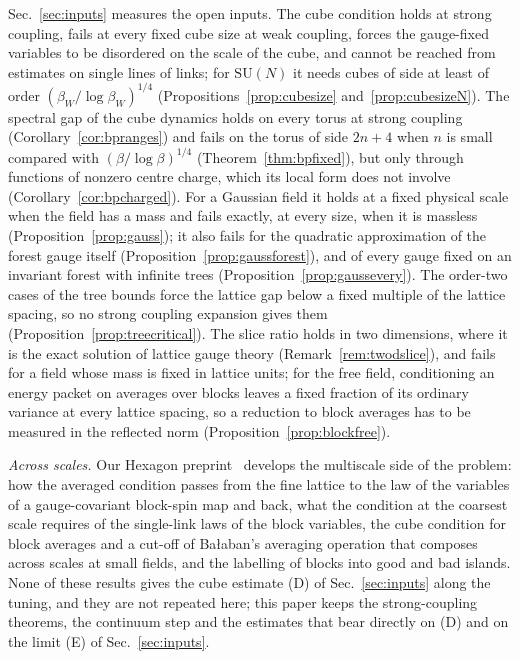 \documentclass[aps,prd,twocolumn,superscriptaddress,nofootinbib,longbibliography,floatfix,amsmath,amssymb,10pt]{revtex4-2}
\theoremstyle{definition}
\theoremstyle{remark}
\newcommand{\SU}{\mathrm{SU}}
\begin{document}
Sec.~\ref{sec:inputs} measures the open inputs. The cube condition holds
at strong coupling, fails at every fixed cube size at weak coupling, forces
the gauge-fixed variables to be disordered on the scale of the cube, and
cannot be reached from estimates on single lines of links; for $\SU(N)$ it
needs cubes of side at least of order $(\beta_W/\log\beta_W)^{1/4}$
(Propositions~\ref{prop:cubesize} and~\ref{prop:cubesizeN}). The
spectral gap of the cube dynamics holds on every torus at strong coupling
(Corollary~\ref{cor:bpranges}) and fails on the torus of side $2n+4$ when
$n$ is small compared with $(\beta/\log\beta)^{1/4}$
(Theorem~\ref{thm:bpfixed}), but only through functions of nonzero centre
charge, which its local form does not involve
(Corollary~\ref{cor:bpcharged}). For a Gaussian
field it holds at a fixed physical scale when the field has a mass and fails
exactly, at every size, when it is massless (Proposition~\ref{prop:gauss});
it also fails for the quadratic approximation of the forest gauge itself
(Proposition~\ref{prop:gaussforest}), and of every gauge fixed on an
invariant forest with infinite trees (Proposition~\ref{prop:gaussevery}). The order-two cases of the tree bounds
force the lattice gap below a fixed multiple of the lattice spacing, so no
strong coupling expansion gives them (Proposition~\ref{prop:treecritical}).
The slice ratio holds in two dimensions, where it is the exact solution of
lattice gauge theory (Remark~\ref{rem:twodslice}), and fails for a field
whose mass is fixed in lattice units; for the free field, conditioning an
energy packet on averages over blocks leaves a fixed fraction of its ordinary
variance at every lattice spacing, so a reduction to block averages has to be
measured in the reflected norm (Proposition~\ref{prop:blockfree}).

\emph{Across scales.} Our Hexagon preprint~\cite{BBLR26} develops the
multiscale side of the problem: how the averaged condition passes from the
fine lattice to the law of the variables of a gauge-covariant block-spin map
and back, what the condition at the coarsest scale requires of the
single-link laws of the block variables, the cube condition for block
averages and a cut-off of Ba{\l}aban's averaging operation that composes
across scales at small fields, and the labelling of blocks into good and bad
islands. None of these results gives the cube estimate (D) of Sec.~\ref{sec:inputs} along the tuning, and they are not
repeated here; this paper keeps the strong-coupling theorems, the continuum
step and the estimates that bear directly on (D) and on the limit (E) of Sec.~\ref{sec:inputs}.
\end{document}
